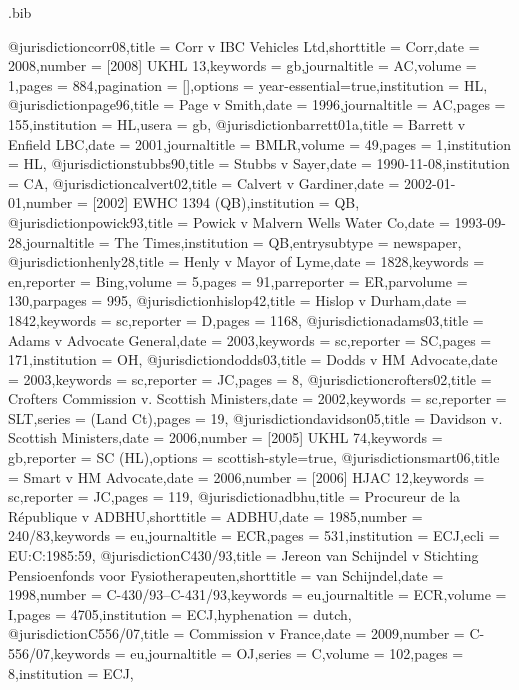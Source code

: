 
\begin{filecontents*}[overwrite]{\jobname.bib}

@jurisdiction{corr08,title = {Corr v IBC Vehicles Ltd},shorttitle = {Corr},date = {2008},number = {[2008]  UKHL 13},keywords = {gb},journaltitle = {AC},volume = {1},pages = {884},pagination = {[]},options = {year-essential=true},institution = {HL},}
@jurisdiction{page96,title = {Page v Smith},date = {1996},journaltitle = {AC},pages = {155},institution = {HL},usera = {gb},}
@jurisdiction{barrett01a,title = {Barrett v Enfield LBC},date = {2001},journaltitle = {BMLR},volume = {49},pages = {1},institution = {HL},}
@jurisdiction{stubbs90,title = {Stubbs v Sayer},date = { 1990-11-08},institution = {CA},}
@jurisdiction{calvert02,title = {Calvert v Gardiner},date = { 2002-01-01},number = {[2002] EWHC 1394 (QB)},institution = {QB},}
@jurisdiction{powick93,title = {Powick v Malvern Wells Water Co},date = {1993-09-28},journaltitle = {The Times},institution = {QB},entrysubtype = {newspaper},}
@jurisdiction{henly28,title = {Henly v Mayor of Lyme},date = {1828},keywords = {en},reporter = {Bing},volume = {5},pages = {91},parreporter = {ER},parvolume = {130},parpages = {995},}
@jurisdiction{hislop42,title = {Hislop v Durham},date = {1842},keywords = {sc},reporter = {D},pages = {1168},}
@jurisdiction{adams03,title = {Adams v Advocate General},date = {2003},keywords = {sc},reporter = {SC},pages = {171},institution = {OH},}
@jurisdiction{dodds03,title = {Dodds v HM Advocate},date = {2003},keywords = {sc},reporter = {JC},pages = {8},}
@jurisdiction{crofters02,title = {Crofters Commission v. Scottish Ministers},date = {2002},keywords = {sc},reporter = {SLT},series = {(Land Ct)},pages = {19},}
@jurisdiction{davidson05,title = {Davidson v. Scottish Ministers},date = {2006},number = {[2005] UKHL 74},keywords = {gb},reporter = {SC (HL)},options = {scottish-style=true},}
@jurisdiction{smart06,title = {Smart v HM Advocate},date = {2006},number = {[2006] HJAC 12},keywords = {sc},reporter = {JC},pages = {119},}
@jurisdiction{adbhu,title = {Procureur de la République v ADBHU},shorttitle = {ADBHU},date = {1985},number = {240/83},keywords = {eu},journaltitle = {ECR},pages = {531},institution = {ECJ},ecli = {EU:C:1985:59},}
@jurisdiction{C430/93,title = {Jereon van Schijndel v Stichting Pensioenfonds voor Fysiotherapeuten},shorttitle = {van Schijndel},date = {1998},number = {C-430/93--C-431/93},keywords = {eu},journaltitle = {ECR},volume = {I},pages = {4705},institution = {ECJ},hyphenation = {dutch},}
@jurisdiction{C556/07,title = {Commission v France},date = {2009},number = {C-556/07},keywords = {eu},journaltitle = {OJ},series = {C},volume = {102},pages = {8},institution = {ECJ},}

\end{filecontents*}
